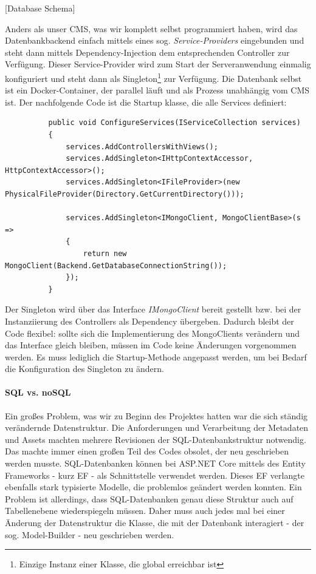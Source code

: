 \documentclass[titlepage, a4paper, 11pt]{scrartcl}
\begin{document}
        [Database Schema]
        
        Anders als unser CMS, was wir komplett selbst programmiert haben, wird das Datenbankbackend einfach mittels eines sog. \textit{Service-Providers} eingebunden
        und steht dann mittels Dependency-Injection dem entsprechenden Controller zur Verfügung. Dieser Service-Provider wird zum Start der Serveranwendung einmalig 
        konfiguriert und steht dann als Singleton\footnote{Einzige Instanz einer Klasse, die global erreichbar ist} zur Verfügung. Die Datenbank selbst ist ein Docker-Container,
        der parallel läuft und als Prozess unabhängig vom CMS ist. Der nachfolgende Code ist die Startup klasse, die alle Services definiert:

        \begin{lstlisting}          
          public void ConfigureServices(IServiceCollection services)
          {
              services.AddControllersWithViews();
              services.AddSingleton<IHttpContextAccessor, HttpContextAccessor>();
              services.AddSingleton<IFileProvider>(new PhysicalFileProvider(Directory.GetCurrentDirectory()));
  
              services.AddSingleton<IMongoClient, MongoClientBase>(s =>
              {
                  return new MongoClient(Backend.GetDatabaseConnectionString());
              });
          }
        \end{lstlisting}

        Der Singleton wird über das Interface \textit{IMongoClient} bereit gestellt bzw. bei der Instanziierung des Controllers als Dependency übergeben.
        Dadurch bleibt der Code flexibel: sollte sich die Implementierung des MongoClients verändern und das Interface gleich bleiben, müssen im Code keine Änderungen vorgenommen werden.
        Es muss lediglich die Startup-Methode angepasst werden, um bei Bedarf die Konfiguration des Singleton zu ändern.        

        \paragraph{SQL vs. noSQL}

          Ein großes Problem, was wir zu Beginn des Projektes hatten war die sich ständig verändernde Datenstruktur. Die Anforderungen und Verarbeitung der Metadaten und 
          Assets machten mehrere Revisionen der SQL-Datenbankstruktur notwendig. Das machte immer einen großen Teil des Codes obsolet, der neu geschrieben werden musste.
          SQL-Datenbanken können bei ASP.NET Core mittels des Entity Frameworks - kurz EF - als Schnittstelle verwendet werden. Dieses EF verlangte ebenfalls stark typisierte Modelle, 
          die problemlos geändert werden konnten. Ein Problem ist allerdings, dass SQL-Datenbanken genau diese Struktur auch auf Tabellenebene wiederspiegeln müssen.
          Daher muss auch jedes mal bei einer Änderung der Datenstruktur die Klasse, die mit der Datenbank interagiert - der sog. Model-Builder - neu geschrieben werden.
          
\end{document}
